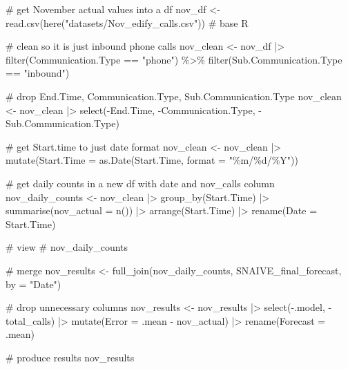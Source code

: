 \documentclass[
  letterpaper,
  DIV=11,
  numbers=noendperiod]{scrartcl}
\newenvironment{Shaded}{\begin{snugshade}}{\end{snugshade}}
\newcommand{\AttributeTok}[1]{\textcolor[rgb]{0.40,0.45,0.13}{#1}}
\newcommand{\CommentTok}[1]{\textcolor[rgb]{0.37,0.37,0.37}{#1}}
\newcommand{\FunctionTok}[1]{\textcolor[rgb]{0.28,0.35,0.67}{#1}}
\newcommand{\NormalTok}[1]{\textcolor[rgb]{0.00,0.23,0.31}{#1}}
\newcommand{\OtherTok}[1]{\textcolor[rgb]{0.00,0.23,0.31}{#1}}
\newcommand{\SpecialCharTok}[1]{\textcolor[rgb]{0.37,0.37,0.37}{#1}}
\newcommand{\StringTok}[1]{\textcolor[rgb]{0.13,0.47,0.30}{#1}}
\begin{document}
\begin{Shaded}
\begin{Highlighting}[]
\CommentTok{\# get November actual values into a df}
\NormalTok{nov\_df }\OtherTok{\textless{}{-}} \FunctionTok{read.csv}\NormalTok{(}\FunctionTok{here}\NormalTok{(}\StringTok{"datasets/Nov\_edify\_calls.csv"}\NormalTok{)) }\CommentTok{\# base R}

\CommentTok{\# clean so it is just inbound phone calls}
\NormalTok{nov\_clean }\OtherTok{\textless{}{-}}\NormalTok{ nov\_df }\SpecialCharTok{|\textgreater{}} 
  \FunctionTok{filter}\NormalTok{(Communication.Type }\SpecialCharTok{==} \StringTok{"phone"}\NormalTok{) }\SpecialCharTok{\%\textgreater{}\%}
  \FunctionTok{filter}\NormalTok{(Sub.Communication.Type }\SpecialCharTok{==} \StringTok{"inbound"}\NormalTok{)}

\CommentTok{\# drop End.Time, Communication.Type, Sub.Communication.Type}
\NormalTok{nov\_clean }\OtherTok{\textless{}{-}}\NormalTok{ nov\_clean }\SpecialCharTok{|\textgreater{}} 
  \FunctionTok{select}\NormalTok{(}\SpecialCharTok{{-}}\NormalTok{End.Time, }\SpecialCharTok{{-}}\NormalTok{Communication.Type, }\SpecialCharTok{{-}}\NormalTok{Sub.Communication.Type)}

\CommentTok{\# get Start.time to just date format}
\NormalTok{nov\_clean }\OtherTok{\textless{}{-}}\NormalTok{ nov\_clean }\SpecialCharTok{|\textgreater{}}
  \FunctionTok{mutate}\NormalTok{(}\AttributeTok{Start.Time =} \FunctionTok{as.Date}\NormalTok{(Start.Time, }\AttributeTok{format =} \StringTok{"\%m/\%d/\%Y"}\NormalTok{))}

\CommentTok{\# get daily counts in a new df with date and nov\_calls column}
\NormalTok{nov\_daily\_counts }\OtherTok{\textless{}{-}}\NormalTok{ nov\_clean }\SpecialCharTok{|\textgreater{}} 
  \FunctionTok{group\_by}\NormalTok{(Start.Time) }\SpecialCharTok{|\textgreater{}} 
  \FunctionTok{summarise}\NormalTok{(}\AttributeTok{nov\_actual =} \FunctionTok{n}\NormalTok{()) }\SpecialCharTok{|\textgreater{}} 
  \FunctionTok{arrange}\NormalTok{(Start.Time) }\SpecialCharTok{|\textgreater{}} 
  \FunctionTok{rename}\NormalTok{(}\AttributeTok{Date =}\NormalTok{ Start.Time)}

\CommentTok{\# view}
\CommentTok{\# nov\_daily\_counts}

\CommentTok{\# merge}
\NormalTok{nov\_results }\OtherTok{\textless{}{-}} \FunctionTok{full\_join}\NormalTok{(nov\_daily\_counts, SNAIVE\_final\_forecast, }\AttributeTok{by =} \StringTok{"Date"}\NormalTok{)}

\CommentTok{\# drop unnecessary columns}
\NormalTok{nov\_results }\OtherTok{\textless{}{-}}\NormalTok{ nov\_results }\SpecialCharTok{|\textgreater{}} 
  \FunctionTok{select}\NormalTok{(}\SpecialCharTok{{-}}\NormalTok{.model, }\SpecialCharTok{{-}}\NormalTok{total\_calls) }\SpecialCharTok{|\textgreater{}}
  \FunctionTok{mutate}\NormalTok{(}\AttributeTok{Error =}\NormalTok{ .mean }\SpecialCharTok{{-}}\NormalTok{ nov\_actual) }\SpecialCharTok{|\textgreater{}} 
  \FunctionTok{rename}\NormalTok{(}\AttributeTok{Forecast =}\NormalTok{ .mean)}

\CommentTok{\# produce results}
\NormalTok{nov\_results}
\end{Highlighting}
\end{Shaded}
\end{document}
